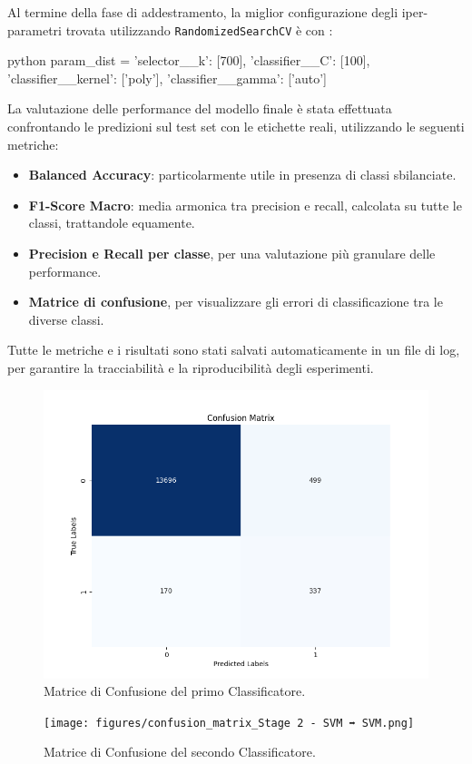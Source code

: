 \documentclass[minted, draw]{../tex/hebdomon}
\begin{document}

Al termine della fase di addestramento, la miglior configurazione degli iper-parametri trovata utilizzando \texttt{RandomizedSearchCV} è  con :

%
\begin{code}{python}
  param_dist = {
        'selector__k': [700],
        'classifier__C': [100],
        'classifier__kernel': ['poly'],
        'classifier__gamma': ['auto'] 
    }
\end{code}
%

La valutazione delle performance del modello finale è stata effettuata confrontando le predizioni sul test set con le etichette reali, utilizzando le seguenti metriche:

\begin{itemize}
\item \textbf{Balanced Accuracy}: particolarmente utile in presenza di classi sbilanciate.
\item \textbf{F1-Score Macro}: media armonica tra precision e recall, calcolata su tutte le classi, trattandole equamente.
\item \textbf{Precision e Recall per classe}, per una valutazione più granulare delle performance.
\item \textbf{Matrice di confusione}, per visualizzare gli errori di classificazione tra le diverse classi.
\end{itemize}

Tutte le metriche e i risultati sono stati salvati automaticamente in un file di log, per garantire la tracciabilità e la riproducibilità degli esperimenti.

% 
\begin{figure}[H]
  \centering
  \includegraphics[width=.8\linewidth]{figures/confusion_matrix_Stage 1 - SVM.png}
  \caption{Matrice di Confusione del primo Classificatore.}
  \label{fig:confusion_1}
\end{figure}
% 
\begin{figure}[H]
  \centering
  \texttt{[image: figures/confusion\_matrix\_Stage 2 - SVM ➡ SVM.png]}
  \caption{Matrice di Confusione del secondo Classificatore.}
  \label{fig:confusion_2}
\end{figure}
%
\end{document}
